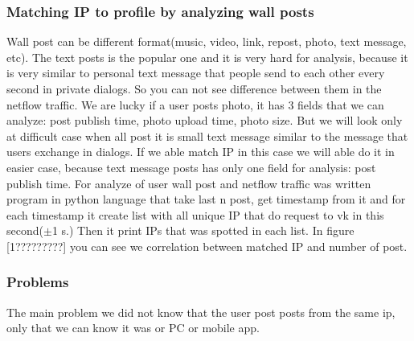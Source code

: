 \subsubsection{Matching IP to profile by analyzing wall posts}
Wall post can be different format(music, video, link, repost, photo, text message, etc). The text posts is the popular one and it is very hard for analysis, because it is very similar to personal text message that people send to each other every second in private dialogs. So you can not see difference between them in the netflow traffic. We are lucky if a user posts photo, it has 3 fields that we can analyze: post publish time, photo upload time, photo size. But we will look only at difficult case when all post it is small text message similar to the message that users exchange in dialogs. If we able match IP in this case we will able do it in easier case, because text message posts has only one field for analysis: post publish time. For analyze of user wall post and netflow traffic was written program in python language that take last n post, get timestamp from it and for each timestamp it create list with all unique IP that do request to vk in this second($\pm$1 s.) Then it print IPs that was spotted in each list. In figure [1?????????] you can see we correlation between matched IP and number of post. 
 
\begin{figure}[H]%
\end{figure}

\subsubsection{Problems}
The main problem we did not know that the user post posts from the same ip, only that we can know it was or PC or mobile app. 

